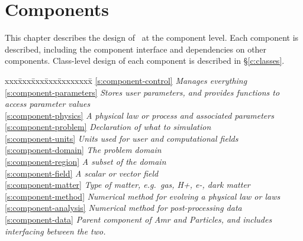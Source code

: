 \chapter{Components} \label{c:components}


   This chapter describes the design of \cello\ at the component
   level.  Each component is described, including the component
   interface and dependencies on other components.  Class-level design
   of each component is described in \S\ref{c:classes}.

\begin{tabbing}
xxx\=xxx\=xxx\=xxx\=xxxxxxxx\= \kill
\ref{s:component-control} \>           \>\>\>\> \textit{Manages everything}  \\
\ref{s:component-parameters} \>           \>\>\>\> \textit{Stores user parameters, and provides functions to access parameter values}  \\
\ref{s:component-physics}  \>\>           \>\>\> \textit{A physical law or process and associated parameters} \\
\ref{s:component-problem}  \>\>           \>\>\> \textit{Declaration of what to simulation} \\
\ref{s:component-units}  \>\>\>             \>\> \textit{Units used for user and computational fields} \\
\ref{s:component-domain}  \>\>\>            \>\> \textit{The problem domain} \\
\ref{s:component-region}  \>\>\>\>            \> \textit{A subset of the domain} \\
\ref{s:component-field}  \>\>\>             \>\> \textit{A scalar or vector field} \\
\ref{s:component-matter}  \>\>\>          \>\> \textit{Type of matter, e.g.~gas, H+, e-, dark matter} \\
\ref{s:component-method}  \>\>            \>\>\> \textit{Numerical method for evolving a physical law or laws} \\
\ref{s:component-analysis}  \>\>          \>\>\> \textit{Numerical method for post-processing data} \\
\ref{s:component-data}  \>\>              \>\>\> \textit{Parent component of Amr and Particles, and includes interfacing between the two.} \\

\end{tabbing}
